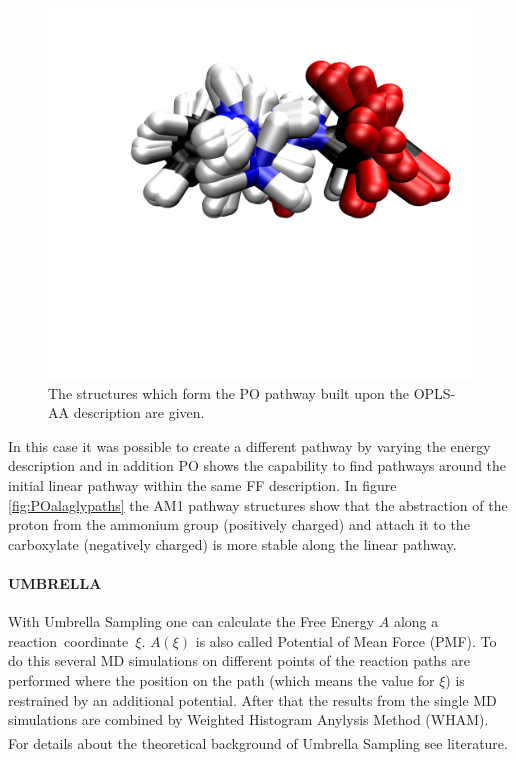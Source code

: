 \documentclass[a4paper,11pt]{scrartcl}
\newcommand{\myCite}[1]{\textsuperscript{\cite{#1}}}
\begin{document}
\begin{figure}[H]
		\center
		\includegraphics[scale=0.1]{Pathopt/PO_gly_ala_1.png}\caption{The structures which form the PO pathway built upon the OPLS-AA description are given.}
\label{fig:POalaglystrucpo}
\end{figure}
In this case it was possible to create a different pathway by varying the energy description and in addition PO shows the capability to find pathways around the initial linear pathway within the same FF description. In figure \ref{fig:POalaglypaths} the AM1 pathway structures show that the abstraction of the proton from the ammonium group (positively charged) and attach it to the carboxylate (negatively charged) is more stable along the linear pathway. 

\paragraph{UMBRELLA}

With Umbrella Sampling one can calculate the Free Energy $A$ along a \mbox{reaction coordinate $\xi$.} $A(\xi)$ is also called Potential of Mean Force (PMF). To do this several MD simulations on different points of the reaction paths are performed where the position on the path (which means the value for $\xi$) is restrained by an additional potential. After that the results from the single MD simulations are combined by Weighted Histogram Anylysis Method (WHAM). For details about the theoretical background of Umbrella Sampling see literature.\myCite{kastner_umbrella_2011}\myCite{souaille_extension_2001}
\end{document}

